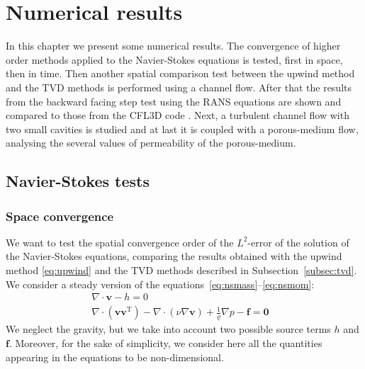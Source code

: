 \chapter{Numerical results} \label{chap:results}
In this chapter we present some numerical results. The convergence of higher 
order methods applied to the Navier-Stokes equations is tested, first in space, 
then in time. Then another spatial comparison test between the upwind method 
and the TVD methods is performed using a channel flow. After that the results 
from the backward facing step test using the RANS equations are shown and 
compared to those from the CFL3D code \cite{web:nasa}. Next, a turbulent 
channel flow with two small cavities is studied and at last it is coupled
with a porous-medium flow, analysing the several values of permeability of the porous-medium.
%
\section{Navier-Stokes tests}
\subsection{Space convergence} \label{subsec:conv}
We want to test the spatial convergence order of the $L^2$-error of the 
solution of the Navier-Stokes equations, comparing the results obtained with 
the upwind method \eqref{eq:upwind} and the TVD methods described in 
Subsection~\ref{subsec:tvd}.\\
We consider a steady version of the 
equations~\eqref{eq:nsmass}--\eqref{eq:nsmom}:
\begin{align}
	\label{eq:nssteadymass} \nabla \cdot \mathbf{v} -h = 0&\\
	\label{eq:nssteadymom} \nabla \cdot (\mathbf{v} \mathbf{v}^\mathrm{T}) - 
	\nabla \cdot (\nu \nabla \mathbf{v}) + \frac{1}{\varrho}\nabla p  
	-\mathbf{f} = \mathbf{0}&
\end{align}
We neglect the gravity, but we take into account two possible source terms 
$h$ and $\mathbf{f}$. Moreover, for the sake of simplicity, we consider here 
all the quantities appearing in the equations to be non-dimensional.
%
